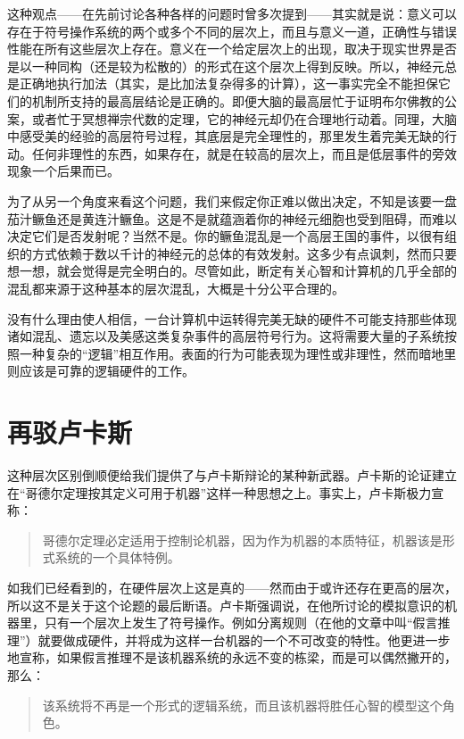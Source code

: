这种观点——在先前讨论各种各样的问题时曾多次提到——其实就是说：意义可以存在于符号操作系统的两个或多个不同的层次上，而且与意义一道，正确性与错误性能在所有这些层次上存在。意义在一个给定层次上的出现，取决于现实世界是否是以一种同构（还是较为松散的）的形式在这个层次上得到反映。所以，神经元总是正确地执行加法（其实，是比加法复杂得多的计算），这一事实完全不能担保它们的机制所支持的最高层结论是正确的。即便大脑的最高层忙于证明布尔佛教的公案，或者忙于冥想禅宗代数的定理，它的神经元却仍在合理地行动着。同理，大脑中感受美的经验的高层符号过程，其底层是完全理性的，那里发生着完美无缺的行动。任何非理性的东西，如果存在，就是在较高的层次上，而且是低层事件的旁效现象一个后果而已。

为了从另一个角度来看这个问题，我们来假定你正难以做出决定，不知是该要一盘茄汁鳜鱼还是黄连汁鳜鱼。这是不是就蕴涵着你的神经元细胞也受到阻碍，而难以决定它们是否发射呢？当然不是。你的鳜鱼混乱是一个高层王国的事件，以很有组织的方式依赖于数以千计的神经元的总体的有效发射。这多少有点讽刺，然而只要想一想，就会觉得是完全明白的。尽管如此，断定有关心智和计算机的几乎全部的混乱都来源于这种基本的层次混乱，大概是十分公平合理的。

没有什么理由使人相信，一台计算机中运转得完美无缺的硬件不可能支持那些体现诸如混乱、遗忘以及美感这类复杂事件的高层符号行为。这将需要大量的子系统按照一种复杂的“逻辑”相互作用。表面的行为可能表现为理性或非理性，然而暗地里则应该是可靠的逻辑硬件的工作。

\section{再驳卢卡斯}

这种层次区别倒顺便给我们提供了与卢卡斯辩论的某种新武器。卢卡斯的论证建立在“哥德尔定理按其定义可用于机器”这样一种思想之上。事实上，卢卡斯极力宣称：

\begin{quote}
哥德尔定理必定适用于控制论机器，因为作为机器的本质特征，机器该是形式系统的一个具体特例。
\end{quote}

如我们已经看到的，在硬件层次上这是真的——然而由于或许还存在更高的层次，所以这不是关于这个论题的最后断语。卢卡斯强调说，在他所讨论的模拟意识的机器里，只有一个层次上发生了符号操作。例如分离规则（在他的文章中叫“假言推理”）就要做成硬件，并将成为这样一台机器的一个不可改变的特性。他更进一步地宣称，如果假言推理不是该机器系统的永远不变的栋梁，而是可以偶然撇开的，那么：

\begin{quote}
该系统将不再是一个形式的逻辑系统，而且该机器将胜任心智的模型这个角色。
\end{quote}

